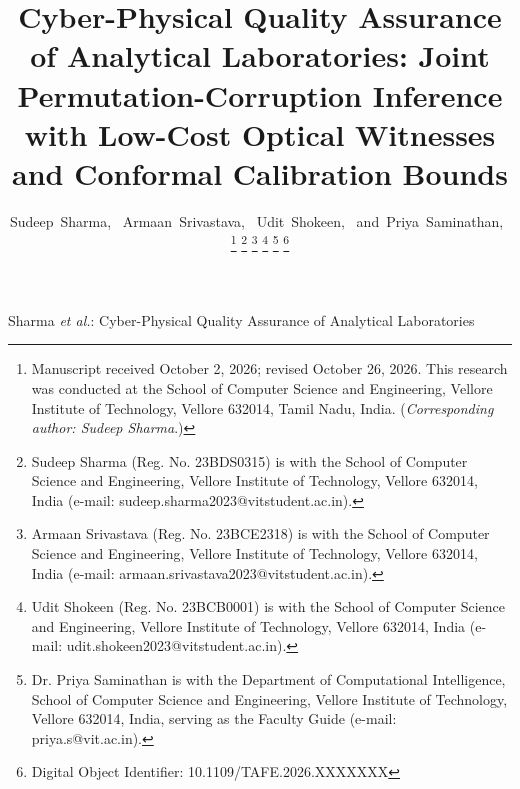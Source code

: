 \documentclass[journal,twoside]{IEEEtran}
\begin{document}
\title{Cyber-Physical Quality Assurance of Analytical Laboratories: Joint Permutation-Corruption Inference with Low-Cost Optical Witnesses and Conformal Calibration Bounds}

\author{Sudeep~Sharma,~
        Armaan~Srivastava,~
        Udit~Shokeen,~
        and~Priya~Saminathan,~%
\thanks{Manuscript received October 2, 2026; revised October 26, 2026. This research was conducted at the School of Computer Science and Engineering, Vellore Institute of Technology, Vellore 632014, Tamil Nadu, India. (\emph{Corresponding author: Sudeep Sharma}.)}%
\thanks{Sudeep Sharma (Reg. No. 23BDS0315) is with the School of Computer Science and Engineering, Vellore Institute of Technology, Vellore 632014, India (e-mail: sudeep.sharma2023@vitstudent.ac.in).}%
\thanks{Armaan Srivastava (Reg. No. 23BCE2318) is with the School of Computer Science and Engineering, Vellore Institute of Technology, Vellore 632014, India (e-mail: armaan.srivastava2023@vitstudent.ac.in).}%
\thanks{Udit Shokeen (Reg. No. 23BCB0001) is with the School of Computer Science and Engineering, Vellore Institute of Technology, Vellore 632014, India (e-mail: udit.shokeen2023@vitstudent.ac.in).}%
\thanks{Dr. Priya Saminathan is with the Department of Computational Intelligence, School of Computer Science and Engineering, Vellore Institute of Technology, Vellore 632014, India, serving as the Faculty Guide (e-mail: priya.s@vit.ac.in).}%
\thanks{Digital Object Identifier: 10.1109/TAFE.2026.XXXXXXX}}

%
{Sharma \MakeLowercase{\textit{et al.}}: Cyber-Physical Quality Assurance of Analytical Laboratories}

\maketitle
\end{document}
